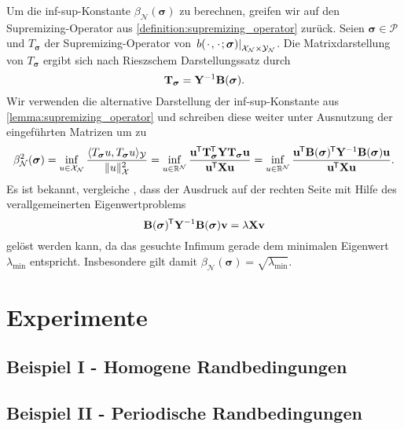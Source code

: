 \documentclass[../main.tex]{subfiles}
\begin{document}
Um die inf-sup-Konstante $\beta_{\mathcal N}(\bm \sigma)$ zu berechnen, greifen wir auf den Supremizing-Operator aus \cref{definition:supremizing_operator} zurück.
Seien $\bm \sigma \in \mathcal P$ und $T_{\bm \sigma}$ der Supremizing-Operator von $\left.b({\mkern2mu\cdot\mkern2mu}, {\mkern2mu\cdot\mkern2mu}; \bm \sigma)\right|_{\mathcal X_{\mathcal N} \times \mathcal Y_{\mathcal N}}$.
Die Matrixdarstellung von $T_{\bm \sigma}$ ergibt sich nach Rieszschem Darstellungssatz durch
\begin{equation}
    \mathbf{T}_{\bm \sigma} = \mathbf{Y}^{-1} \mathbf{B}(\bm \sigma).
\end{equation}
Wir verwenden die alternative Darstellung der inf-sup-Konstante aus \cref{lemma:supremizing_operator} und schreiben diese weiter unter Ausnutzung der eingeführten Matrizen um zu
\begin{equation}
    \beta_{\mathcal N}^{2}(\bm \sigma)
    = \inf_{u \in \mathcal X_{\mathcal N}} \frac{\langle T_{\bm \sigma} u,T_{\bm \sigma} u\rangle_{\mathcal Y}}{\lVert u\rVert_{\mathcal X}^{2}}
    = \inf_{u \in \mathbb{R}^{\mathcal N}} \frac{\mathbf{u}^{\mkern-1.5mu\mathsf{T}} \mathbf{T}_{\bm \sigma}^{\mkern-1.5mu\mathsf{T}} \mathbf{Y} \mathbf{T}_{\bm \sigma} \mathbf{u}}{\mathbf{u}^{\mkern-1.5mu\mathsf{T}} \mathbf{X} \mathbf{u}}
    = \inf_{u \in \mathbb{R}^{\mathcal N}} \frac{\mathbf{u}^{\mkern-1.5mu\mathsf{T}} \mathbf{B}(\bm \sigma)^{\mkern-1.5mu\mathsf{T}} \mathbf{Y}^{-1} \mathbf{B}(\bm \sigma) \mathbf{u}}{\mathbf{u}^{\mkern-1.5mu\mathsf{T}} \mathbf{X} \mathbf{u}}.
\end{equation}
Es ist bekannt, vergleiche \cite[Subsection 1.3.5]{Patera:2007un}, dass der Ausdruck auf der rechten Seite mit Hilfe des verallgemeinerten Eigenwertproblems
\begin{equation}
    \mathbf{B}(\bm \sigma)^{\mkern-1.5mu\mathsf{T}} \mathbf{Y}^{-1} \mathbf{B}(\bm \sigma) \mathbf{v} = \lambda \mathbf{X} \mathbf{v}
\end{equation}
gelöst werden kann, da das gesuchte Infimum gerade dem minimalen Eigenwert $\lambda_{\min}$ entspricht.
Insbesondere gilt damit $\beta_{\mathcal N}(\bm \sigma) = \sqrt{\lambda_{\min}}$.



\section{Experimente} %
\label{sec:experimente}

\subsection{Beispiel I - Homogene Randbedingungen} %
\label{sub:beispiel}


\subsection{Beispiel II - Periodische Randbedingungen} %
\label{sub:beispiel_ii_periodische_randbedingungen}


\end{document}
